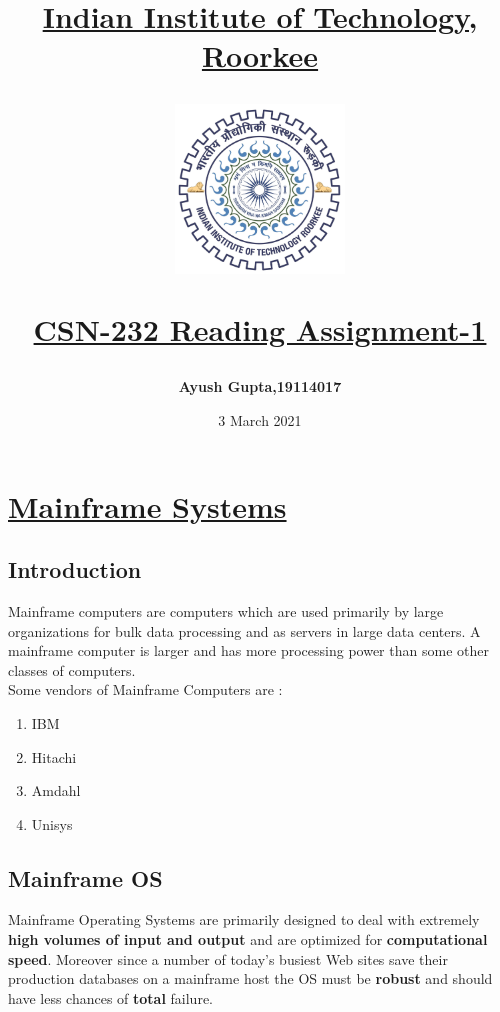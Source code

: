 \documentclass{article}
\title{
\textbf{\underline{Indian Institute of Technology, Roorkee}}

\begin{figure}[H]
    \centering
    \includegraphics[width=0.4\textwidth]{IITR_new_logo_color.jpg}
\end{figure}
\textbf{\underline{CSN-232 Reading Assignment-1}}}
\author{
\textbf{Ayush Gupta,19114017} \\
}
\date{3 March 2021}
\begin{document}
\maketitle
\tableofcontents

\section{\underline{Mainframe Systems}}
      \subsection{Introduction}
      Mainframe computers are computers which are used primarily by large organizations for bulk data processing and as servers in large data centers. A mainframe computer is larger and has more processing power than some other classes of computers. \\
      Some vendors of Mainframe Computers are :
      \begin{enumerate}
          \item IBM
          \item Hitachi
          \item Amdahl
          \item Unisys
      \end{enumerate}
      \subsection{Mainframe OS}
      Mainframe Operating Systems are primarily designed to deal with extremely \textbf{high volumes of input and output} and are optimized for \textbf{computational speed}. Moreover since a number of today’s busiest Web sites save their production databases on a mainframe host the OS must be \textbf{robust} and should have less chances of \textbf{total} failure.
\end{document}
